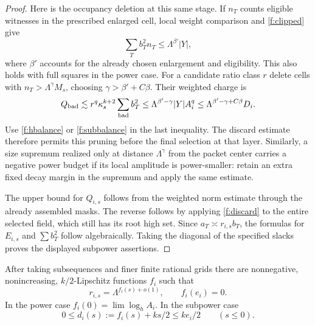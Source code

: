 \begin{proof}
Here is the occupancy deletion at this same stage. If $n_T$ counts
eligible witnesses in the prescribed enlarged cell, local weight
comparison and \eqref{f:clipped} give
\[
 \sum_Tb_T^2n_T\le\Lambda^{\beta'}|Y|,
\]
where $\beta'$ accounts for the already chosen enlargement and
eligibility. This also holds with full squares in the power case.
For a candidate ratio class $r$ delete cells with
$n_T>\Lambda^\gamma M_s$, choosing $\gamma>\beta'+C\beta$. Their
weighted charge is
\[
 Q_{\rm bad}\lesssim r^q\kappa_s^{k+2}
                  \sum_{\rm bad}b_T^2
 \le\Lambda^{\beta'-\gamma}|Y|A_i^q
 \le\Lambda^{\beta'-\gamma+C\beta}D_i.
\]
Use \eqref{f:hbalance} or \eqref{f:subbalance} in the last inequality.
The discard estimate therefore permits this pruning before the final
selection at that layer. Similarly, a size supremum realized only at
distance $\Lambda^\gamma$ from the packet center carries a negative
power budget if its local amplitude is power-smaller: retain an extra
fixed decay margin in the supremum and apply the same estimate.

The upper bound for $Q_{i,s}$ follows from the weighted norm estimate
through the already assembled masks. The reverse follows by applying
\eqref{f:discard} to the entire selected field, which still has its
root high set. Since $a_T\asymp r_{i,s}b_T$, the formulas for $E_{i,s}$
and $\sum b_T^2$ follow algebraically. Taking the diagonal of the
specified slacks proves the displayed subpower assertions.
\end{proof}

\begin{lemma}[Profiles]\label{f:profiles}
After taking subsequences and finer finite rational grids there are
nonnegative, nonincreasing, $k/2$-Lipschitz functions $f_i$ such that
\[
 r_{i,s}=\Lambda^{f_i(s)+o(1)},\qquad f_i(e_i)=0.
\]
In the power case $f_i(0)=\lim\log_h A_i$. In the subpower case
\begin{equation}\label{f:d-bounded}
 0\le d_i(s):=f_i(s)+ks/2\le ke_i/2\qquad(s\le0).
\end{equation}
\end{lemma}


